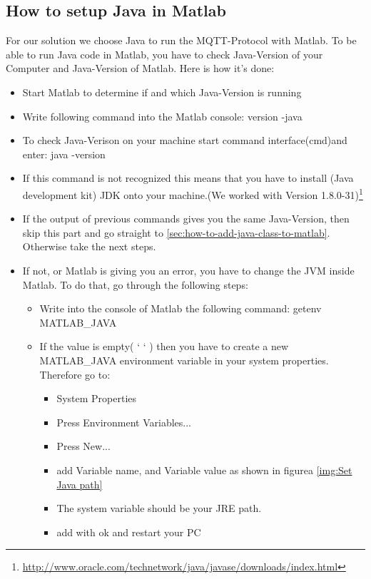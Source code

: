 \documentclass[12pt]{article}
\begin{document}
\newpage
\subsection{How to setup Java in Matlab}\label{sec:how-to-setup-java-in-matlab}

For our solution we choose Java to run the MQTT-Protocol with Matlab. 
To be able to run Java code in Matlab, you have to check Java-Version of your Computer and Java-Version of Matlab.
Here is how it's done:

\begin{itemize}
	
	\item Start Matlab to determine if and which Java-Version is running 
	\item Write following command into the Matlab console: version -java
	\item To check Java-Verison on your machine start command interface(cmd)and enter: java -version 
	\item If this command is not recognized this means that you have to install (Java development kit) JDK onto your machine.(We worked with Version 1.8.0-31)\footnote{\url{http://www.oracle.com/technetwork/java/javase/downloads/index.html}}
	\item If the output of previous commands gives you the same Java-Version, then skip this part and go straight to \ref{sec:how-to-add-java-class-to-matlab}. Otherwise take the next steps. 
	\item If not, or Matlab is giving you an error, you have to change the JVM inside Matlab. To do that, go through the following steps:
	\begin{itemize}
		\item Write into the console of Matlab the following command:	
		\newline		getenv MATLAB\_JAVA	
		\item If the value is empty( ‘ ‘ ) then you have to create a new MATLAB\_JAVA environment variable in your system properties. Therefore go to:
			\begin{itemize}
				\item System Properties
				\item Press Environment Variables...
				\item Press New...
				\item add Variable name, and Variable value as shown in figurea \ref{img:Set Java path}
				\item The system variable should be your JRE path.
				\item add with ok and restart your PC

\end{itemize}
\end{itemize}
\end{itemize}
\end{document}
